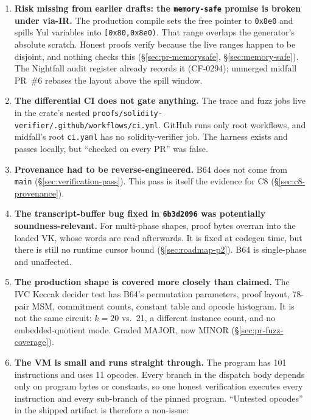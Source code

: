 \begin{enumerate}[leftmargin=1.6em,itemsep=3pt]
\item \textbf{Risk missing from earlier drafts: the \texttt{memory-safe} promise is broken under
  via-IR.} The production compile sets the free pointer to \texttt{0x8e0}
  and spills Yul variables into \texttt{[0x80,0x8e0)}. That range overlaps
  the generator's absolute scratch. Honest proofs verify because the live
  ranges happen to be disjoint, and nothing checks this
  (\S\ref{sec:pr-memorysafe}, \S\ref{sec:memory-safe}). The Nightfall audit register already
  records it (CF-0294); unmerged midfall PR~\#6 rebases the layout above the spill window.
\item \textbf{The differential CI does not gate anything.} The trace and
  fuzz jobs live in the crate's nested
  \texttt{proofs/\allowbreak{}solidity-verifier/\allowbreak{}.github/\allowbreak{}workflows/\allowbreak{}ci.yml}. GitHub runs
  only root workflows, and midfall's root \texttt{ci.yaml} has no
  solidity-verifier job. The harness exists and passes locally, but
  ``checked on every PR'' was false. 
\item \textbf{Provenance had to be reverse-engineered.} B64 does not
  come from \texttt{main} (\S\ref{sec:verification-pass}). This pass is
  itself the evidence for C8 (\S\ref{sec:c8-provenance}).
\item \textbf{The transcript-buffer bug fixed in \texttt{6b3d2096} was
  potentially soundness-relevant.} For multi-phase shapes, proof bytes
  overran into the loaded VK, whose words are read afterwards. It is fixed at
  codegen time, but there is still no runtime cursor bound
  (\S\ref{sec:roadmap-p2}). B64 is single-phase and unaffected.
\item \textbf{The production shape is covered more closely than claimed.}
  The IVC Keccak decider test has B64's permutation parameters, proof
  layout, 78-pair MSM, commitment counts, constant table and opcode
  histogram. It is not the same circuit: $k=20$ vs.\ 21, a different
  instance count, and no embedded-quotient mode. Graded MAJOR, now MINOR
  (\S\ref{sec:pr-fuzz-coverage}).
\item \textbf{The VM is small and runs straight through.} The program has
  101 instructions and uses 11 opcodes. Every branch in the dispatch body
  depends only on program bytes or constants, so one honest verification
  executes every instruction and every sub-branch of the pinned program.
  ``Untested opcodes'' in the shipped artifact is therefore a non-issue:

\end{enumerate}
